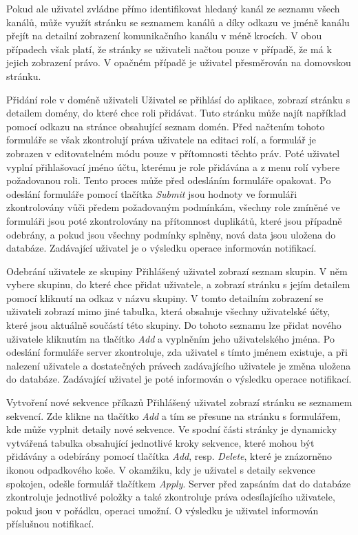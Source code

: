 \begin{enumfunctional}[style=nextline]
Pokud ale uživatel zvládne přímo identifikovat hledaný kanál ze seznamu všech kanálů, může využít stránku se seznamem kanálů a díky odkazu ve jméně kanálu přejít na detailní zobrazení komunikačního kanálu v méně krocích. V obou případech však platí, že stránky se uživateli načtou pouze v případě, že má k jejich zobrazení právo. V opačném případě je uživatel přesměrován na domovskou stránku.
\item[Přidání role v doméně uživateli]
Uživatel se přihlásí do aplikace, zobrazí stránku s detailem domény, do které chce roli přidávat. Tuto stránku může najít například pomocí odkazu na stránce obsahující seznam domén. Před načtením tohoto formuláře se však zkontrolují práva uživatele na editaci rolí, a formulář je zobrazen v editovatelném módu pouze v přítomnosti těchto práv. Poté uživatel vyplní přihlašovací jméno účtu, kterému je role přidávána a z menu rolí vybere požadovanou roli. Tento proces může před odesláním formuláře opakovat. Po odeslání formuláře pomocí tlačítka \emph{Submit} jsou hodnoty ve formuláři zkontrolovány vůči předem požadovaným podmínkám, všechny role zmíněné ve formuláři jsou poté zkontrolovány na přítomnost duplikátů, které jsou případně odebrány, a pokud jsou všechny podmínky splněny, nová data jsou uložena do databáze. Zadávající uživatel je o výsledku operace informován notifikací.
\item[Odebrání uživatele ze skupiny]
Přihlášený uživatel zobrazí seznam skupin. V něm vybere skupinu, do které chce přidat uživatele, a zobrazí stránku s jejím detailem pomocí kliknutí na odkaz v názvu skupiny. V tomto detailním zobrazení se uživateli zobrazí mimo jiné tabulka, která obsahuje všechny uživatelské účty, které jsou aktuálně součástí této skupiny. Do tohoto seznamu lze přidat nového uživatele kliknutím na tlačítko \emph{Add} a vyplněním jeho uživatelského jména. Po odeslání formuláře server zkontroluje, zda uživatel s tímto jménem existuje, a při nalezení uživatele a dostatečných právech zadávajícího uživatele je změna uložena do databáze. Zadávající uživatel je poté informován o výsledku operace notifikací.
\item[Vytvoření nové sekvence příkazů]
Přihlášený uživatel zobrazí stránku se seznamem sekvencí. Zde klikne na tlačítko \emph{Add} a tím se přesune na stránku s formulářem, kde může vyplnit detaily nové sekvence. Ve spodní části stránky je dynamicky vytvářená tabulka obsahující jednotlivé kroky sekvence, které mohou být přidávány a odebírány pomocí tlačítka \emph{Add}, resp. \emph{Delete}, které je znázorněno ikonou odpadkového koše. V okamžiku, kdy je uživatel s detaily sekvence spokojen, odešle formulář tlačítkem \emph{Apply}. Server před zapsáním dat do databáze zkontroluje jednotlivé položky a také zkontroluje práva odesílajícího uživatele, pokud jsou v pořádku, operaci umožní. O výsledku je uživatel informován příslušnou notifikací.
\end{enumfunctional}

